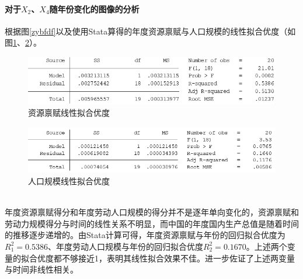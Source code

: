 \documentclass[UTF8]{article}
\begin{document}
	\paragraph{对于$X_2$、$X_4$随年份变化的图像的分析}
	根据图\ref{zybfdf}以及使用Stata算得的年度资源禀赋与人口规模的线性拟合优度（如图\ref{zybfnhyd}、\ref{rkgmnhyd}）。
	\begin{figure}[htb]
	\centering
	\includegraphics[width=12cm]{pictures/zybfnhyd.png}
	\caption{资源禀赋线性拟合优度}
	\label{zybfnhyd}
	\end{figure}
	\begin{figure}[htb]
	\centering
	\includegraphics[width=12cm]{pictures/rkgmnhyd.png}
	\caption{人口规模线性拟合优度}
	\label{rkgmnhyd}
	\end{figure}
	\\年度资源禀赋得分和年度劳动人口规模的得分并不是逐年单向变化的，资源禀赋和劳动力规模得分与时间的线性关系不明显，而中国的年度国内生产总值是随着时间的推移逐步递增的。由Stata计算可得，年度资源禀赋与年份的回归拟合优度为$R^2_{1}=0.5386$、年度劳动人口规模与年份的回归拟合优度$R^2_{2}=0.1670$。上述两个变量的拟合优度都不够接近1，表明其线性拟合效果不佳。进一步佐证了上述两变量与时间非线性相关。
\end{document}
